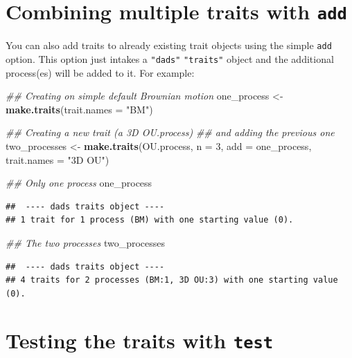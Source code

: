 \documentclass[]{book}
\newenvironment{Shaded}{\begin{snugshade}}{\end{snugshade}}
\newcommand{\CommentTok}[1]{\textcolor[rgb]{0.56,0.35,0.01}{\textit{#1}}}
\newcommand{\DataTypeTok}[1]{\textcolor[rgb]{0.13,0.29,0.53}{#1}}
\newcommand{\DecValTok}[1]{\textcolor[rgb]{0.00,0.00,0.81}{#1}}
\newcommand{\KeywordTok}[1]{\textcolor[rgb]{0.13,0.29,0.53}{\textbf{#1}}}
\newcommand{\NormalTok}[1]{#1}
\newcommand{\StringTok}[1]{\textcolor[rgb]{0.31,0.60,0.02}{#1}}
\begin{document}
\hypertarget{combining-multiple-traits-with-add}{%
\section{\texorpdfstring{Combining multiple traits with \texttt{add}}{Combining multiple traits with add}}\label{combining-multiple-traits-with-add}}

You can also add traits to already existing trait objects using the simple \texttt{add} option.
This option just intakes a \texttt{"dads"} \texttt{"traits"} object and the additional process(es) will be added to it. For example:

\begin{Shaded}
\begin{Highlighting}[]
\CommentTok{## Creating on simple default Brownian motion}
\NormalTok{one_process <-}\StringTok{ }\KeywordTok{make.traits}\NormalTok{(}\DataTypeTok{trait.names =} \StringTok{"BM"}\NormalTok{)}

\CommentTok{## Creating a new trait (a 3D OU.process)}
\CommentTok{## and adding the previous one}
\NormalTok{two_processes <-}\StringTok{ }\KeywordTok{make.traits}\NormalTok{(OU.process, }\DataTypeTok{n =} \DecValTok{3}\NormalTok{, }\DataTypeTok{add =}\NormalTok{ one_process,}
                             \DataTypeTok{trait.names =} \StringTok{"3D OU"}\NormalTok{)}

\CommentTok{## Only one process}
\NormalTok{one_process}
\end{Highlighting}
\end{Shaded}

\begin{verbatim}
##  ---- dads traits object ---- 
## 1 trait for 1 process (BM) with one starting value (0).
\end{verbatim}

\begin{Shaded}
\begin{Highlighting}[]
\CommentTok{## The two processes}
\NormalTok{two_processes}
\end{Highlighting}
\end{Shaded}

\begin{verbatim}
##  ---- dads traits object ---- 
## 4 traits for 2 processes (BM:1, 3D OU:3) with one starting value (0).
\end{verbatim}

\hypertarget{testing-the-traits-with-test}{%
\section{\texorpdfstring{Testing the traits with \texttt{test}}{Testing the traits with test}}\label{testing-the-traits-with-test}}
\end{document}
